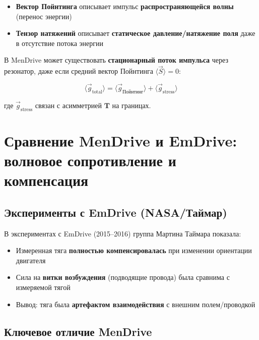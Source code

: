 \documentclass[a4paper,12pt]{article}
\begin{document}
{\begin{itemize}
    \item \textbf{Вектор Пойнтинга} описывает импульс \textbf{распространяющейся
    волны} (перенос энергии)
    \item \textbf{Тензор натяжений} описывает \textbf{статическое
    давление/натяжение поля} даже в отсутствие потока энергии
\end{itemize}

В MenDrive может существовать \textbf{стационарный поток импульса} через
резонатор, даже если средний вектор Пойнтинга $\langle \vec{S} \rangle = 0$:

\begin{equation}
\langle \vec{g}_{\text{total}} \rangle = \langle \vec{g}_{\text{Пойнтинг}}
\rangle + \langle \vec{g}_{\text{stress}} \rangle
\label{eq:total_momentum_density}
\end{equation}

где $\vec{g}_{\text{stress}}$ связан с асимметрией $\mathbf{T}$ на границах.

\section{Сравнение MenDrive и EmDrive: волновое сопротивление и компенсация}

\subsection{Эксперименты с EmDrive (NASA/Таймар)}

В экспериментах с EmDrive (2015--2016) группа Мартина Таймара \cite{Tajmar2016}
показала:

\begin{itemize}
    \item Измеренная тяга \textbf{полностью компенсировалась} при изменении
    ориентации двигателя
    \item Сила на \textbf{витки возбуждения} (подводящие провода) была
    сравнима с измеряемой тягой
    \item Вывод: тяга была \textbf{артефактом взаимодействия} с внешним
    полем/проводкой
\end{itemize}

\subsection{Ключевое отличие MenDrive}

}
\end{document}
